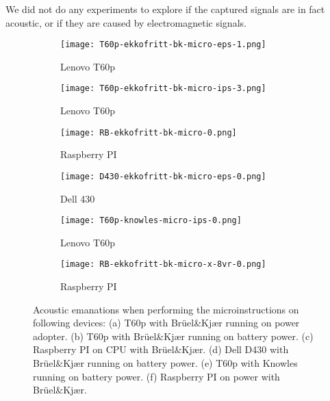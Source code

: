 We did not do any experiments to explore if the captured signals are in fact acoustic, or if they are caused by electromagnetic signals.

\begin{figure}[ht]
    \centering
    \begin{subfigure}{0.32\textwidth}
        \centering
        \texttt{[image: T60p-ekkofritt-bk-micro-eps-1.png]}
        \caption{Lenovo T60p}
        \label{fig:comparison_T60p-ekkofritt-bk-micro-eps-1}
    \end{subfigure}
    \begin{subfigure}{0.32\textwidth}
        \centering
        \texttt{[image: T60p-ekkofritt-bk-micro-ips-3.png]}
        \caption{Lenovo T60p}
        \label{fig:comparison_T60p-ekkofritt-bk-micro-ips-3}
    \end{subfigure}
    \begin{subfigure}{0.32\textwidth}
        \centering
        \texttt{[image: RB-ekkofritt-bk-micro-0.png]}
        \caption{Raspberry PI}
        \label{fig:comparison_RB-ekkofritt-bk-micro-0}
    \end{subfigure}
    \begin{subfigure}{0.32\textwidth}
        \centering
        \texttt{[image: D430-ekkofritt-bk-micro-eps-0.png]}
        \caption{Dell 430}
        \label{fig:comparison_D430-ekkofritt-bk-micro-eps-0}
    \end{subfigure}
    \begin{subfigure}{0.32\textwidth}
        \centering
        \texttt{[image: T60p-knowles-micro-ips-0.png]}
        \caption{Lenovo T60p}
        \label{fig:comparison_T60p-knowles-micro-ips-0}
    \end{subfigure}
    \begin{subfigure}{0.32\textwidth}
        \centering
        \texttt{[image: RB-ekkofritt-bk-micro-x-8vr-0.png]}
        \caption{Raspberry PI}
        \label{fig:comparison_RB-ekkofritt-bk-micro-x-8vr-0}
    \end{subfigure}
    \caption{ Acoustic emanations when performing the microinstructions on following devices:
    (a) T60p with Brüel\&Kjær running on power adopter.
    (b) T60p with Brüel\&Kjær running on battery power.
    (c) Raspberry PI on CPU with Brüel\&Kjær.
    (d) Dell D430 with Brüel\&Kjær running on battery power.
    (e) T60p with Knowles running on battery power.
    (f) Raspberry PI on power with Brüel\&Kjær.}
    \label{fig:comparison_micorinstructions}
\end{figure}

